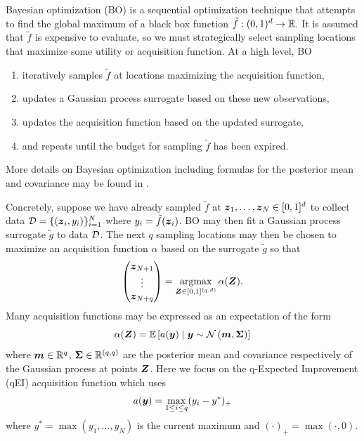 \documentclass{article}[12pt]
\begin{document}
Bayesian optimization (BO) is a sequential optimization technique that attempts to find the global maximum of a black box function $\tilde{f}: (0,1)^{d} \to \mathbb{R}$. It is assumed that $\tilde{f}$ is expensive to evaluate, so we must strategically select sampling locations that maximize some utility or acquisition function. At a high level, BO 
\begin{enumerate}
    \item iteratively samples $\tilde{f}$ at locations maximizing the acquisition function,
    \item updates a Gaussian process surrogate based on these new observations,
    \item updates the acquisition function based on the updated surrogate,
    \item and repeats until the budget for sampling $\tilde{f}$ has been expired.
\end{enumerate}
More details on Bayesian optimization including formulas for the posterior mean and covariance may be found in \cite{frazier2018tutorial}.

Concretely, suppose we have already sampled $\tilde{f}$ at $\boldsymbol{z}_1,\dots,\boldsymbol{z}_{N} \in [0,1]^{d}$ to collect data $\mathcal{D}=\{(\boldsymbol{z}_i,y_i)\}_{i=1}^N$ where $y_i = \tilde{f}(\boldsymbol{z}_i)$. BO may then fit a Gaussian process surrogate $\tilde{g}$ to data $\mathcal{D}$. The next $q$ sampling locations may then be chosen to maximize  an acquisition function $\alpha$ based on the surrogate $\tilde{g}$ so that 
\begin{equation}
    \begin{pmatrix}\boldsymbol{z}_{N+1} \\ \vdots \\ \boldsymbol{z}_{N+q}\end{pmatrix} = \operatorname*{argmax}_{\boldsymbol{Z} \in [0,1]^{(q,d)}}\alpha(\boldsymbol{Z}).
    \label{eq:nextq}
\end{equation}
Many acquisition functions may be expressed as an expectation of the form
$$\alpha(\boldsymbol{Z}) = \mathbb{E}\left[a(\boldsymbol{y}) \mid \boldsymbol{y} \sim \mathcal{N}\left(\boldsymbol{m},\boldsymbol{\Sigma}\right)\right]$$
where $\boldsymbol{m} \in \mathbb{R}^{q}$, $\boldsymbol{\Sigma} \in \mathbb{R}^{(q, q)}$ are the posterior mean and covariance respectively of the Gaussian process at points $\boldsymbol{Z}$. Here we focus on the q-Expected Improvement (qEI) acquisition function which uses 
$$a(\boldsymbol{y}) = \max_{1 \leq i \leq q} (y_i - y^*)_+$$
where $y^*= \max\left(y_1,\dots,y_N\right)$ is the current maximum and $(\cdot)_+ = \max(\cdot,0)$. 
\end{document}
